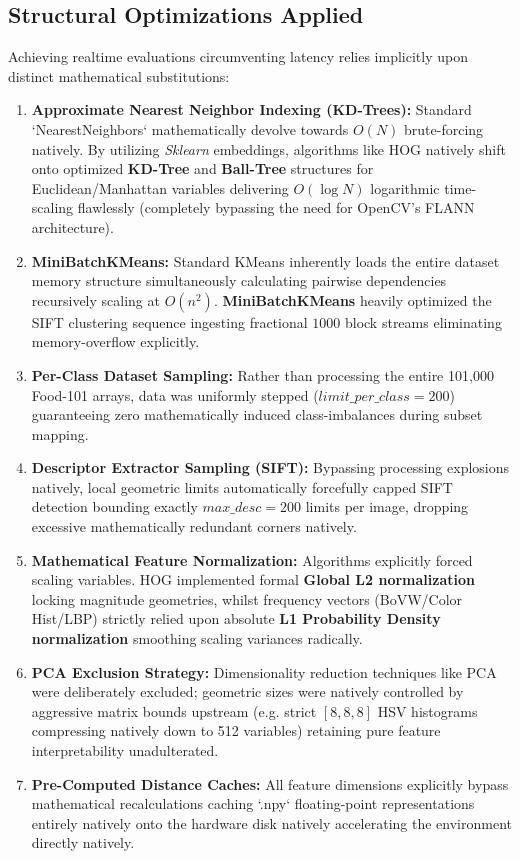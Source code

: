 \documentclass[11pt, a4paper]{article}
\begin{document}
\subsection{Structural Optimizations Applied}
Achieving realtime evaluations circumventing latency relies implicitly upon distinct mathematical substitutions:
\begin{enumerate}
    \item \textbf{Approximate Nearest Neighbor Indexing (KD-Trees):} Standard `NearestNeighbors` mathematically devolve towards $O(N)$ brute-forcing natively. By utilizing \textit{Sklearn} embeddings, algorithms like HOG natively shift onto optimized \textbf{KD-Tree} and \textbf{Ball-Tree} structures for Euclidean/Manhattan variables delivering $O(\log N)$ logarithmic time-scaling flawlessly (completely bypassing the need for OpenCV's FLANN architecture).
    \item \textbf{MiniBatchKMeans:} Standard KMeans inherently loads the entire dataset memory structure simultaneously calculating pairwise dependencies recursively scaling at $O(n^2)$. \textbf{MiniBatchKMeans} heavily optimized the SIFT clustering sequence ingesting fractional $1000$ block streams eliminating memory-overflow explicitly.
    \item \textbf{Per-Class Dataset Sampling:} Rather than processing the entire 101,000 Food-101 arrays, data was uniformly stepped ($limit\_per\_class=200$) guaranteeing zero mathematically induced class-imbalances during subset mapping.
    \item \textbf{Descriptor Extractor Sampling (SIFT):} Bypassing processing explosions natively, local geometric limits automatically forcefully capped SIFT detection bounding exactly $max\_desc=200$ limits per image, dropping excessive mathematically redundant corners natively.
    \item \textbf{Mathematical Feature Normalization:} Algorithms explicitly forced scaling variables. HOG implemented formal \textbf{Global L2 normalization} locking magnitude geometries, whilst frequency vectors (BoVW/Color Hist/LBP) strictly relied upon absolute \textbf{L1 Probability Density normalization} smoothing scaling variances radically.
    \item \textbf{PCA Exclusion Strategy:} Dimensionality reduction techniques like PCA were deliberately excluded; geometric sizes were natively controlled by aggressive matrix bounds upstream (e.g. strict $[8, 8, 8]$ HSV histograms compressing natively down to 512 variables) retaining pure feature interpretability unadulterated.
    \item \textbf{Pre-Computed Distance Caches:} All feature dimensions explicitly bypass mathematical recalculations caching `.npy` floating-point representations entirely natively onto the hardware disk natively accelerating the environment directly natively.
\end{enumerate}
\end{document}
